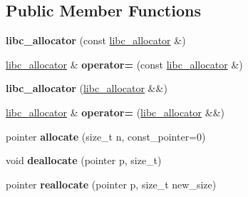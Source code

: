 \subsection*{Public Member Functions}
\begin{DoxyCompactItemize}
\item 
{\bfseries libc\+\_\+allocator} (const \hyperlink{classspp___1_1libc__allocator}{libc\+\_\+allocator} \&)\hypertarget{classspp___1_1libc__allocator_a9753e14c02159f383a2d0c45033c0fd5}{}\label{classspp___1_1libc__allocator_a9753e14c02159f383a2d0c45033c0fd5}

\item 
\hyperlink{classspp___1_1libc__allocator}{libc\+\_\+allocator} \& {\bfseries operator=} (const \hyperlink{classspp___1_1libc__allocator}{libc\+\_\+allocator} \&)\hypertarget{classspp___1_1libc__allocator_a99556024547627ce5288f9fdb9df69f1}{}\label{classspp___1_1libc__allocator_a99556024547627ce5288f9fdb9df69f1}

\item 
{\bfseries libc\+\_\+allocator} (\hyperlink{classspp___1_1libc__allocator}{libc\+\_\+allocator} \&\&)\hypertarget{classspp___1_1libc__allocator_a286af05245e73e68f6bb259b56d115a8}{}\label{classspp___1_1libc__allocator_a286af05245e73e68f6bb259b56d115a8}

\item 
\hyperlink{classspp___1_1libc__allocator}{libc\+\_\+allocator} \& {\bfseries operator=} (\hyperlink{classspp___1_1libc__allocator}{libc\+\_\+allocator} \&\&)\hypertarget{classspp___1_1libc__allocator_a50d126edb622f99126da870bddd7b12d}{}\label{classspp___1_1libc__allocator_a50d126edb622f99126da870bddd7b12d}

\item 
pointer {\bfseries allocate} (size\+\_\+t n, const\+\_\+pointer=0)\hypertarget{classspp___1_1libc__allocator_a7b66db1f9511221d705cc6108dd3c85c}{}\label{classspp___1_1libc__allocator_a7b66db1f9511221d705cc6108dd3c85c}

\item 
void {\bfseries deallocate} (pointer p, size\+\_\+t)\hypertarget{classspp___1_1libc__allocator_a55476fb1ca07f24dd621808221c535d5}{}\label{classspp___1_1libc__allocator_a55476fb1ca07f24dd621808221c535d5}

\item 
pointer {\bfseries reallocate} (pointer p, size\+\_\+t new\+\_\+size)\hypertarget{classspp___1_1libc__allocator_ab5a0bcd38a26aa2582a7626bf4606beb}{}\label{classspp___1_1libc__allocator_ab5a0bcd38a26aa2582a7626bf4606beb}


\end{DoxyCompactItemize}

